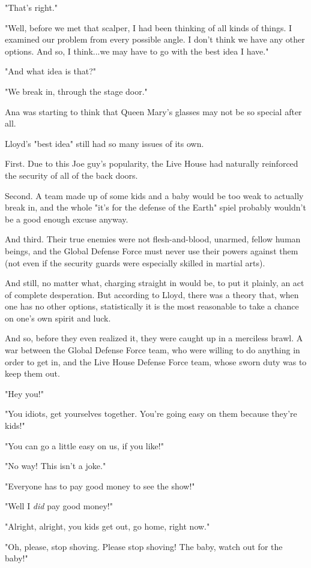 \documentclass[
]{article}
\begin{document}
"That's right."

"Well, before we met that scalper, I had been thinking of all kinds of
things. I examined our problem from every possible angle. I don't think
we have any other options. And so, I think...we may have to go with the
best idea I have."

"And what idea is that?"

"We break in, through the stage door."

Ana was starting to think that Queen Mary's glasses may not be so
special after all.

Lloyd's "best idea" still had so many issues of its own.

First. Due to this Joe guy's popularity, the Live House had naturally
reinforced the security of all of the back doors.

Second. A team made up of some kids and a baby would be too weak to
actually break in, and the whole "it's for the defense of the Earth"
spiel probably wouldn't be a good enough excuse anyway.

And third. Their true enemies were not flesh-and-blood, unarmed, fellow
human beings, and the Global Defense Force must never use their powers
against them (not even if the security guards were especially skilled in
martial arts).

And still, no matter what, charging straight in would be, to put it
plainly, an act of complete desperation. But according to Lloyd, there
was a theory that, when one has no other options, statistically it is
the most reasonable to take a chance on one's own spirit and luck.

And so, before they even realized it, they were caught up in a merciless
brawl. A war between the Global Defense Force team, who were willing to
do anything in order to get in, and the Live House Defense Force team,
whose sworn duty was to keep them out.

"Hey you!"

"You idiots, get yourselves together. You're going easy on them because
they're kids!"

"You can go a little easy on us, if you like!"

"No way! This isn't a joke."

"Everyone has to pay good money to see the show!"

"Well I \emph{did} pay good money!"

"Alright, alright, you kids get out, go home, right now."

"Oh, please, stop shoving. Please stop shoving! The baby, watch out for
the baby!"
\end{document}
